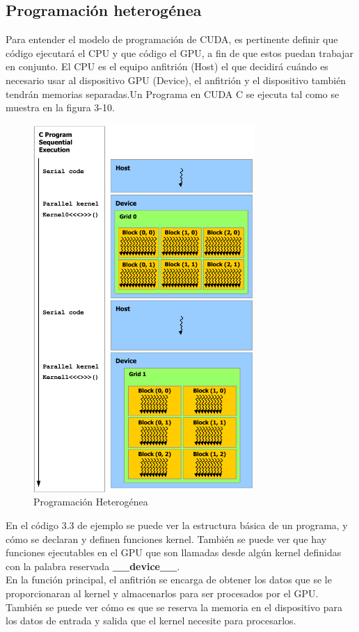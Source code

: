 \subsection{Programación heterogénea}
Para entender el modelo de programación de CUDA, es pertinente definir que código ejecutará el CPU y que código el GPU, a fin de que estos puedan trabajar en conjunto. El CPU es el equipo anfitrión (Host) el que decidirá cuándo es necesario usar al dispositivo GPU (Device), el anfitrión y el dispositivo también tendrán memorias separadas.Un Programa en CUDA C se ejecuta tal como se muestra en la figura 3-10.\\
\begin{figure}[H]
                      \centering
                              \includegraphics[height=14cm]{img/PH.png}
                      \caption{Programación Heterogénea \cite{Flops}}
\end{figure}
En el código 3.3 de ejemplo se puede ver la estructura básica de un programa, y cómo se declaran y definen funciones kernel. También se puede ver que hay funciones ejecutables en el GPU que son llamadas desde algún kernel definidas con la palabra reservada \textbf{\_\_device\_\_}.\\
En la función principal, el anfitrión se encarga de obtener los datos que se le proporcionaran al kernel y almacenarlos para ser procesados por el  GPU. También se puede ver cómo es que se reserva la memoria en el dispositivo para los datos de entrada y salida que el kernel necesite para procesarlos.\\
